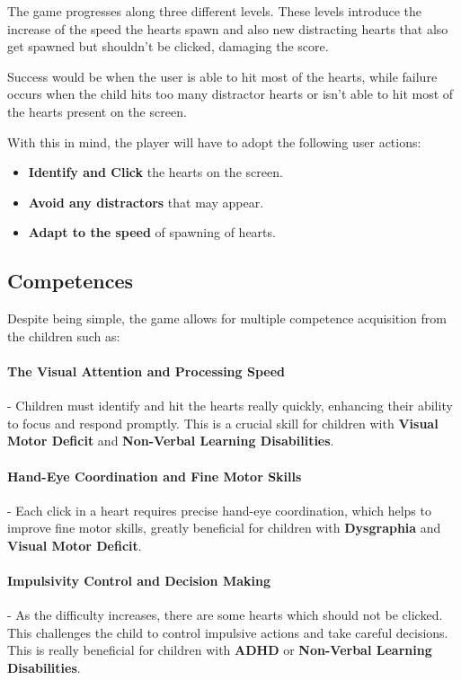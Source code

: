 The game progresses along three different levels. These levels introduce the increase of the speed the hearts spawn and also new distracting hearts that also get spawned but shouldn't be clicked, damaging the score.

Success would be when the user is able to hit most of the hearts, while failure occurs when the child hits too many distractor hearts or isn't able to hit most of the hearts present on the screen.

With this in mind, the player will have to adopt the following user actions:

\begin{itemize}
    \item \textbf{Identify and Click} the hearts on the screen.
    \item \textbf{Avoid any distractors} that may appear.
    \item \textbf{Adapt to the speed} of spawning of hearts.
\end{itemize}

\subsection{Competences}
Despite being simple, the game allows for multiple competence acquisition from the children such as:

\paragraph{The Visual Attention and Processing Speed}- Children must identify and hit the hearts really quickly, enhancing their ability to focus and respond promptly. This is a crucial skill for children with \textbf{Visual Motor Deficit} and \textbf{Non-Verbal Learning Disabilities}.

\paragraph{Hand-Eye Coordination and Fine Motor Skills}- Each click in a heart requires precise hand-eye coordination, which helps to improve fine motor skills, greatly beneficial for children with \textbf{Dysgraphia} and \textbf{Visual Motor Deficit}.

\paragraph{Impulsivity Control and Decision Making}- As the difficulty increases, there are some hearts which should not be clicked. This challenges the child to control impulsive actions and take careful decisions. This is really beneficial for children with \textbf{ADHD} or \textbf{Non-Verbal Learning Disabilities}.

